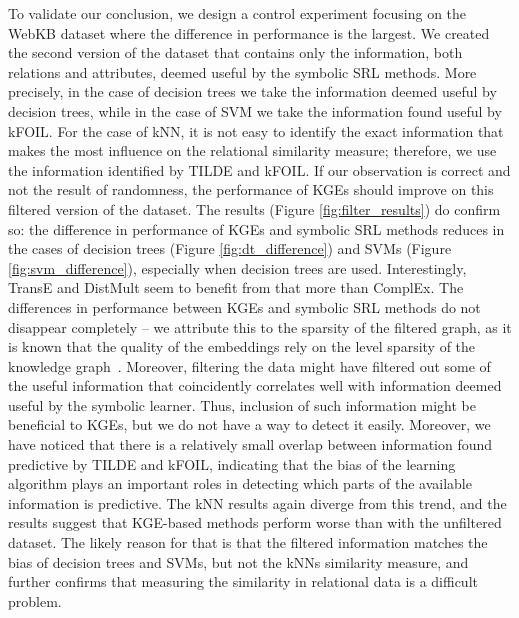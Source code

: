 To validate our conclusion, we design a control experiment focusing on the WebKB dataset where the difference in performance is the largest.
We created the second version of the dataset that contains only the information, both relations and attributes, deemed useful by the symbolic SRL methods.
More precisely, in the case of decision trees we take the information deemed useful by decision trees, while in the case of SVM we take the information found useful by kFOIL.
For the case of kNN, it is not easy to identify the exact information that makes the most influence on the relational similarity measure; therefore, we use the information identified by TILDE and kFOIL.
If our observation is correct and not the result of randomness, the performance of KGEs should improve on this filtered version of the dataset.
The results (Figure \ref{fig:filter_results}) do confirm so: the difference in performance of KGEs and symbolic SRL methods reduces in the cases of decision trees (Figure \ref{fig:dt_difference}) and SVMs (Figure \ref{fig:svm_difference}), especially when decision trees are used.
Interestingly, TransE and DistMult seem to benefit from that more than ComplEx.
The differences in performance between KGEs and symbolic SRL methods do not disappear completely -- we attribute this to the sparsity of the filtered graph, as it is known that the quality of the embeddings rely on the level sparsity of the knowledge graph~\cite{pujara:emnlp17}.
Moreover, filtering the data might have filtered out some of the useful information that coincidently correlates well with information deemed useful by the symbolic learner.
Thus, inclusion of such information might be beneficial to KGEs, but we do not have a way to detect it easily.
Moreover, we have noticed that there is a relatively small overlap between information found predictive by TILDE and kFOIL, indicating that the bias of the learning algorithm plays an important roles in detecting which parts of the available information is predictive.
The kNN results again diverge from this trend, and the results suggest that KGE-based methods perform worse than with the unfiltered dataset.
The likely reason for that is that the filtered information matches the bias of decision trees and SVMs, but not the kNNs similarity measure, and further confirms that measuring the similarity in relational data is a difficult problem.



